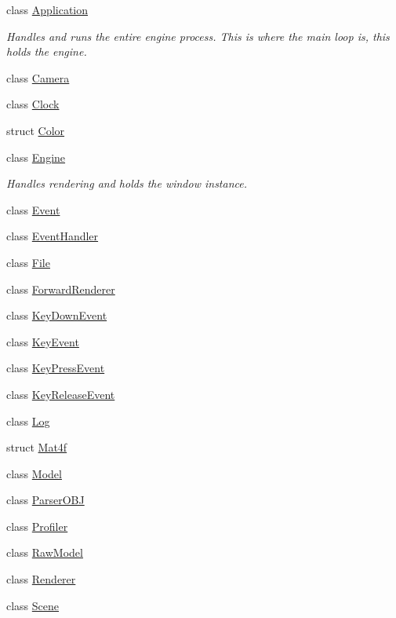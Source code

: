 \begin{DoxyCompactItemize}
\item 
class \hyperlink{classpcs_1_1Application}{Application}
\begin{DoxyCompactList}\small\item\em Handles and runs the entire engine process. This is where the main loop is, this holds the engine. \end{DoxyCompactList}\item 
class \hyperlink{classpcs_1_1Camera}{Camera}
\item 
class \hyperlink{classpcs_1_1Clock}{Clock}
\item 
struct \hyperlink{structpcs_1_1Color}{Color}
\item 
class \hyperlink{classpcs_1_1Engine}{Engine}
\begin{DoxyCompactList}\small\item\em Handles rendering and holds the window instance. \end{DoxyCompactList}\item 
class \hyperlink{classpcs_1_1Event}{Event}
\item 
class \hyperlink{classpcs_1_1EventHandler}{Event\+Handler}
\item 
class \hyperlink{classpcs_1_1File}{File}
\item 
class \hyperlink{classpcs_1_1ForwardRenderer}{Forward\+Renderer}
\item 
class \hyperlink{classpcs_1_1KeyDownEvent}{Key\+Down\+Event}
\item 
class \hyperlink{classpcs_1_1KeyEvent}{Key\+Event}
\item 
class \hyperlink{classpcs_1_1KeyPressEvent}{Key\+Press\+Event}
\item 
class \hyperlink{classpcs_1_1KeyReleaseEvent}{Key\+Release\+Event}
\item 
class \hyperlink{classpcs_1_1Log}{Log}
\item 
struct \hyperlink{structpcs_1_1Mat4f}{Mat4f}
\item 
class \hyperlink{classpcs_1_1Model}{Model}
\item 
class \hyperlink{classpcs_1_1ParserOBJ}{Parser\+O\+BJ}
\item 
class \hyperlink{classpcs_1_1Profiler}{Profiler}
\item 
class \hyperlink{classpcs_1_1RawModel}{Raw\+Model}
\item 
class \hyperlink{classpcs_1_1Renderer}{Renderer}
\item 
class \hyperlink{classpcs_1_1Scene}{Scene}

\end{DoxyCompactItemize}
